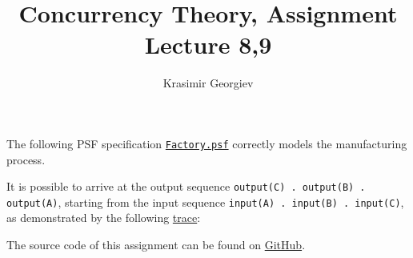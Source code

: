\documentclass[a4paper]{article}
\title{Concurrency Theory, Assignment Lecture 8,9}
\author{Krasimir Georgiev}
\begin{document}
\maketitle

The following PSF specification
\href{https://github.com/comco/concurrency-theory-assignments/tree/master/assignment-lecture-8,9/Factory.psf}{\texttt{Factory.psf}}
correctly models the manufacturing process.

It is possible to arrive at the output sequence \texttt{output(C) . output(B) .
    output(A)}, starting from the input sequence \texttt{input(A) . input(B) .
input(C)}, as demonstrated by the following
\href{https://github.com/comco/concurrency-theory-assignments/tree/master/assignment-lecture-8,9/trace.txt}{trace}:


The source code of this assignment can be found on
\href{https://github.com/comco/concurrency-theory-assignments/tree/master/assignment-lecture-8,9}{GitHub}.
\end{document}
